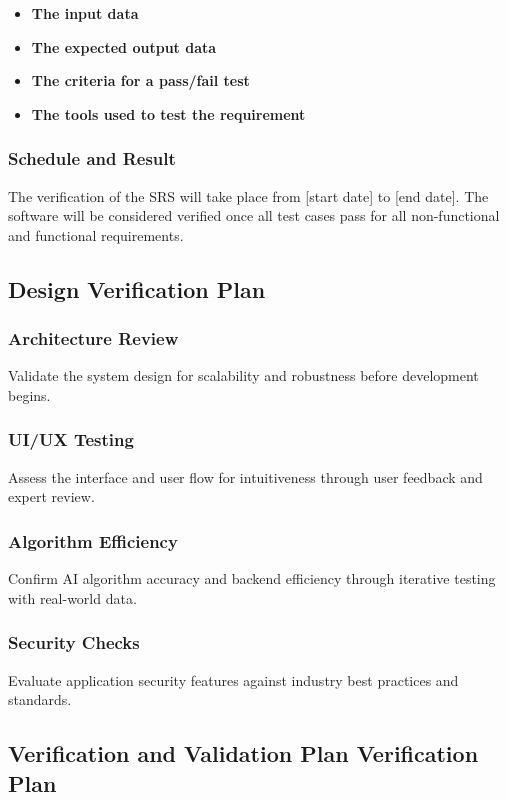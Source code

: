 \documentclass[12pt, titlepage]{article}
\begin{document}
\begin{itemize}
  \item \textbf{The input data}
  \item \textbf{The expected output data}
  \item \textbf{The criteria for a pass/fail test}
  \item \textbf{The tools used to test the requirement}
\end{itemize}

\subsubsection{Schedule and Result}
The verification of the SRS will take place from [start date] to [end date]. The software will be considered verified once all test cases pass for all non-functional and functional requirements.

\subsection{Design Verification Plan}

\subsubsection{Architecture Review}
Validate the system design for scalability and robustness before development begins.

\subsubsection{UI/UX Testing}
Assess the interface and user flow for intuitiveness through user feedback and expert review.

\subsubsection{Algorithm Efficiency}
Confirm AI algorithm accuracy and backend efficiency through iterative testing with real-world data.

\subsubsection{Security Checks}
Evaluate application security features against industry best practices and standards.

\subsection{Verification and Validation Plan Verification Plan}
\end{document}
